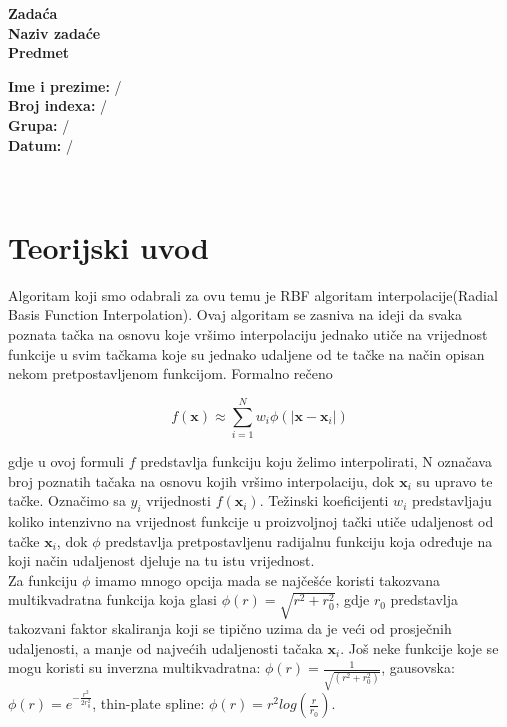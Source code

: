 \documentclass[12pt, a4paper]{report}
\theoremstyle{definition}
\begin{document}
\begin{titlepage}
{			
			\begin{center}
				\LARGE 
				\bfseries 
				Zadaća \textnumero \\
				Naziv zadaće   \\[0.5cm]
				
				\large 
				Predmet
				\\[6.0 cm] 
			\end{center}	 		
			

			\begin{minipage}{0.9\textwidth}
				\begin{flushright}
					\textbf{Ime i prezime:} / \\
					\textbf{Broj indexa:} / \\			
					\textbf{Grupa:} / \\
					\textbf{Datum:} /
				\end{flushright}
			\end{minipage}\\[1 cm]
		}
	\end{titlepage}
	\renewcommand{\chaptermark}[1]{\markboth{#1}{}}
	
	\chapter*{Teorijski uvod}
	Algoritam koji smo odabrali za ovu temu je RBF algoritam interpolacije(Radial Basis Function Interpolation). Ovaj algoritam se zasniva na ideji da svaka poznata tačka na osnovu koje vršimo interpolaciju jednako utiče na vrijednost funkcije u svim tačkama koje su jednako udaljene od te tačke na način opisan nekom pretpostavljenom funkcijom. Formalno rečeno
	
	\[f(\textbf{x}) \approx \sum_{i = 1}^{N}w_i \phi(|\textbf{x} -\textbf{x}_i|)\]
	
	gdje u ovoj formuli $f$ predstavlja funkciju koju želimo interpolirati, N označava broj poznatih tačaka na osnovu kojih vršimo interpolaciju, dok $\textbf{x}_i$ su upravo te tačke. Označimo sa $y_i$ vrijednosti $f(\textbf{x}_i)$. Težinski koeficijenti $w_i$ predstavljaju koliko intenzivno na vrijednost funkcije u proizvoljnoj tački utiče udaljenost od tačke $\textbf{x}_i$, dok $\phi$ predstavlja pretpostavljenu radijalnu funkciju koja određuje na koji način udaljenost djeluje na tu istu vrijednost.\\
	
	Za funkciju $\phi$ imamo mnogo opcija mada se najčešće koristi takozvana multikvadratna funkcija koja glasi $\phi(r) = \sqrt{r^2+r_0^2}$, gdje $r_0$ predstavlja takozvani faktor skaliranja koji se tipično uzima da je veći od prosječnih udaljenosti, a manje od najvećih udaljenosti tačaka $\textbf{x}_i$. Još neke funkcije koje se mogu koristi su inverzna multikvadratna: $\phi(r) = \frac1{\sqrt{(r^2+r_0^2)}}$, gausovska: $\phi(r) = e^{-\frac{r^2}{2r_0^2}}$, thin-plate spline: $\phi(r) = r^2log(\frac{r}{r_0})$.\\
	
\end{document}
